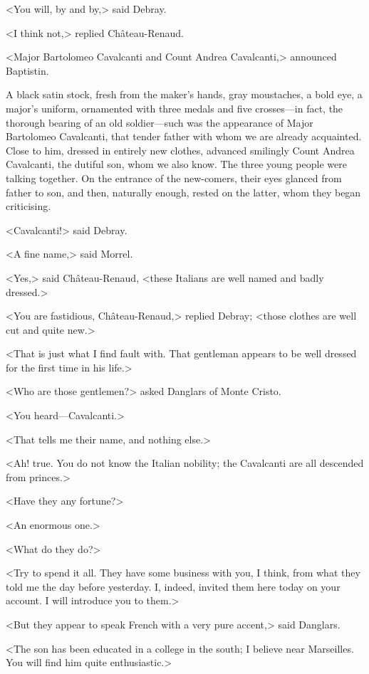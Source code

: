  <You will, by and by,> said Debray. 

 <I think not,> replied Château-Renaud. 

 <Major Bartolomeo Cavalcanti and Count Andrea Cavalcanti,> announced Baptistin. 

 A black satin stock, fresh from the maker's hands, gray moustaches, a bold eye, a major's uniform, ornamented with three medals and five crosses—in fact, the thorough bearing of an old soldier—such was the appearance of Major Bartolomeo Cavalcanti, that tender father with whom we are already acquainted. Close to him, dressed in entirely new clothes, advanced smilingly Count Andrea Cavalcanti, the dutiful son, whom we also know. The three young people were talking together. On the entrance of the new-comers, their eyes glanced from father to son, and then, naturally enough, rested on the latter, whom they began criticising. 

 <Cavalcanti!> said Debray. 

 <A fine name,> said Morrel. 

 <Yes,> said Château-Renaud, <these Italians are well named and badly dressed.> 

 <You are fastidious, Château-Renaud,> replied Debray; <those clothes are well cut and quite new.> 

 <That is just what I find fault with. That gentleman appears to be well dressed for the first time in his life.> 

 <Who are those gentlemen?> asked Danglars of Monte Cristo. 

 <You heard—Cavalcanti.> 

 <That tells me their name, and nothing else.> 

 <Ah! true. You do not know the Italian nobility; the Cavalcanti are all descended from princes.> 

 <Have they any fortune?> 

 <An enormous one.> 

 <What do they do?> 

 <Try to spend it all. They have some business with you, I think, from what they told me the day before yesterday. I, indeed, invited them here today on your account. I will introduce you to them.> 

 <But they appear to speak French with a very pure accent,> said Danglars. 

 <The son has been educated in a college in the south; I believe near Marseilles. You will find him quite enthusiastic.> 

